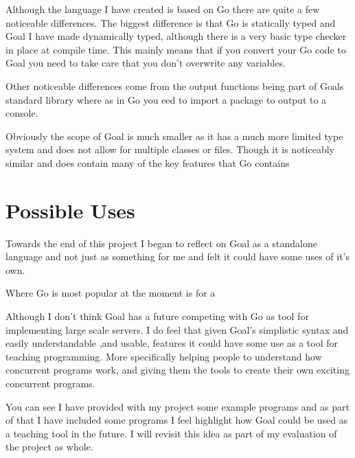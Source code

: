 Although the language I have created is based on Go there are quite a few noticeable differences. The biggest difference is that Go is statically typed and Goal I have made dynamically typed, although there is a very basic type checker in place at compile time. This mainly means that if you convert your Go code to Goal you need to take care that you don't overwrite any variables.

Other noticeable differences come from the output functions being part of Goals standard library where as in Go you eed to import a package to output to a console.

Obviously the scope of Goal is much smaller as it has a much more limited type system and does not allow for multiple classes or files. Though it is noticeably similar and does contain many of the key features that Go contains 

\section{Possible Uses}

Towards the end of this project I began to reflect on Goal as a standalone language and not just as something for me and felt it could have some uses of it's own.

Where Go is most popular at the moment is for a 

Although I don't think Goal has a future competing with Go as tool for implementing large scale servers. I do feel that given Goal's simplistic syntax and easily understandable ,and usable, features it could have some use as a tool for teaching programming. More specifically helping people to understand how concurrent programs work, and giving them the tools to create their own exciting concurrent programs.

You can see I have provided with my project some example programs and as part of that I have included some programs I feel highlight how Goal could be used as a teaching tool in the future. I will revisit this idea as part of my evaluation of the project as whole.    
